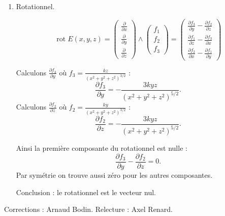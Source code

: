 \documentclass[11pt,a4paper]{article}
\theoremstyle{exostyle}
\newcommand{\rot}{\operatorname{rot}}
\begin{document}
\begin{enumerate}
\begin{enumerate}
		
		\item Rotationnel.
		
		\[\rot E (x,y,z) = 
		\begin{pmatrix}
			\frac{\partial }{\partial x} \\	
			\frac{\partial }{\partial y} \\			
			\frac{\partial }{\partial z} 
		\end{pmatrix} \wedge
		\begin{pmatrix}
			f_1 \\ f_2 \\ f_3
		\end{pmatrix}
		= 	\begin{pmatrix}
			\frac{\partial f_3}{\partial y}-\frac{\partial f_2}{\partial z} \\[1ex]
			\frac{\partial f_1}{\partial z}-\frac{\partial f_3}{\partial x} \\[1ex]
			\frac{\partial f_2}{\partial x}-\frac{\partial f_1}{\partial y}
		\end{pmatrix}
		\]
		
		Calculons $\frac{\partial f_3}{\partial y}$ où $f_3=\frac{kz}{(x^2 + y^2 + z^2)^{3/2}}$ :
		\[
		\frac{\partial f_3}{\partial y} = -\frac{3k yz} {(x^2 + y^2 + z^2)^{5/2}}.
		\]
		Calculons $\frac{\partial f_2}{\partial z}$ où $f_2=\frac{ky}{(x^2 + y^2 + z^2)^{3/2}}$ :
		\[
		\frac{\partial f_2}{\partial z} = -\frac{3k yz} {(x^2 + y^2 + z^2)^{5/2}}.\]	
		
		Ainsi la première composante du rotationnel est nulle :
		\[
		\frac{\partial f_3}{\partial y}-\frac{\partial f_2}{\partial z} = 0.
		\]
		Par symétrie on trouve aussi zéro pour les autres composantes.
		
		Conclusion : le rotationnel est le vecteur nul.
			
	\end{enumerate}			
\end{enumerate}

\fincorrection

\finexercice


\bigskip

Corrections : Arnaud Bodin. Relecture : Axel Renard.
\end{document}

